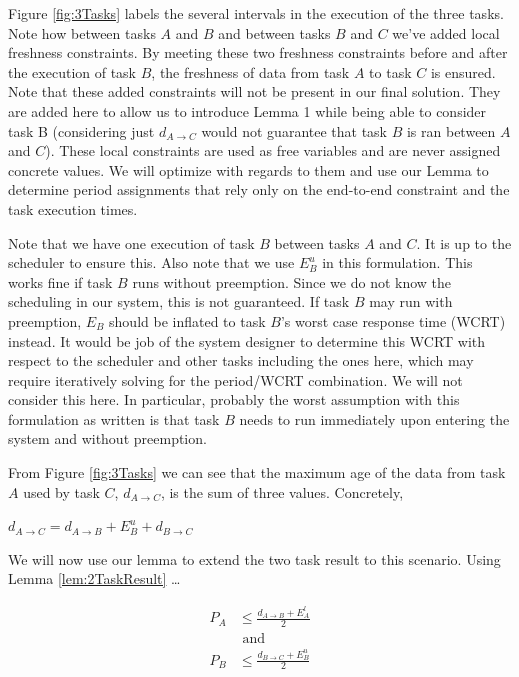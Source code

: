 Figure \ref{fig:3Tasks} labels the several intervals in the execution of the three tasks. Note how between tasks $A$ and $B$ and between tasks $B$ and $C$ we've added local freshness constraints. By meeting these two freshness constraints before and after the execution of task $B$, the freshness of data from task $A$ to task $C$ is ensured. Note that these added constraints will not be present in our final solution. They are added here to allow us to introduce Lemma 1 while being able to consider task B (considering just $d_{A \to C}$ would not guarantee that task $B$ is ran between $A$ and $C$). These local constraints are used as free variables and are never assigned concrete values. We will optimize with regards to them and use our Lemma to determine period assignments that rely only on the end-to-end constraint and the task execution times.

Note that we have one execution of task $B$ between tasks $A$ and $C$. It is up to the scheduler to ensure this. Also note that we use $E^u_B$ in this formulation. This works fine if task $B$ runs without preemption. Since we do not know the scheduling in our system, this is not guaranteed. If task $B$ may run with preemption, $E_B$ should be inflated to task $B$'s worst case response time (WCRT) instead. It would be job of the system designer to determine this WCRT with respect to the scheduler and other tasks including the ones here, which may require iteratively solving for the period/WCRT combination. We will not consider this here. In particular, probably the worst assumption with this formulation as written is that task $B$ needs to run immediately upon entering the system and without preemption.

From Figure \ref{fig:3Tasks} we can see that the maximum age of the data from task $A$ used by task $C$, $d_{A \to C}$, is the sum of three values. Concretely,
\begin{center}
	$d_{A \to C} = d_{A \to B} + E^u_B + d_{B \to C}$\\
\end{center}

We will now use our lemma to extend the two task result to this scenario. Using Lemma \ref{lem:2TaskResult} \ldots

\begin{align*}
	P_A &\leq \frac{d_{A \to B} + E^l_A}{2}\\
	& \text{ and }\\
	P_B &\leq \frac{d_{B \to C} + E^u_B}{2}\\
\end{align*}

